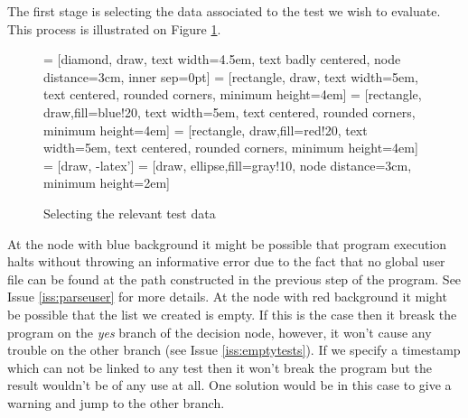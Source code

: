 \documentclass{scrartcl}
\begin{document}
The first stage is selecting the data associated to the test we wish to evaluate. This process is illustrated on Figure \ref{fig:seltest}. 
\begin{figure}
\begin{center}
 = [diamond, draw, 
    text width=4.5em, text badly centered, node distance=3cm, inner sep=0pt]
 = [rectangle, draw, 
    text width=5em, text centered, rounded corners, minimum height=4em]
 = [rectangle, draw,fill=blue!20, 
    text width=5em, text centered, rounded corners, minimum height=4em]
 = [rectangle, draw,fill=red!20, 
    text width=5em, text centered, rounded corners, minimum height=4em]
 = [draw, -latex']
 = [draw, ellipse,fill=gray!10, node distance=3cm,
    minimum height=2em]    
\end{center}
\caption{Selecting the relevant test data}
\label{fig:seltest}
\end{figure}
At the node with \colorbox{blue!20}{blue background} it might be possible that program execution halts without throwing an informative error due to the fact that no global user file can be found at the path constructed in the previous step of the program. See Issue \ref{iss:parseuser} for more details. At the node with \colorbox{red!20}{red background} it might be possible that the list we created is empty. If this is the case then it breask the program on the \emph{yes} branch of the decision node, however, it won't cause any trouble on the other branch (see Issue \ref{iss:emptytests}). If we specify a timestamp which can not be linked to any test then it won't break the program but the result wouldn't be of any use at all. One solution would be in this case to give a warning and jump to the other branch.  
\end{document}
